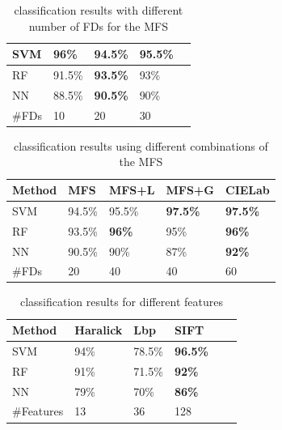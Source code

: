 \documentclass[a4paper,10pt]{article}
\begin{document}
\begin{table}
\begin{center}
\caption{classification results with different number of FDs for the MFS}
\label{tab:number}       %
\begin{tabular}{|l|l|l|l|l|}
\hline
SVM & \textbf{96\%} & 94.5\% & 95.5\% \\
\hline
RF  & 91.5\% & \textbf{93.5\%} & 93\% \\
\hline
NN & 88.5\% & \textbf{90.5\%} & 90\% \\
\hline
\hline
\#FDs & 10  & 20 & 30 \\
\hline
\end{tabular}
\end{center}
\end{table}


\begin{table}
\begin{center}
\caption{classification results using different combinations of the MFS}


\label{tab:mfs}       %
\begin{tabular}{|l|l|l|l|l|}
\hline
Method & MFS & MFS+L & MFS+G & CIELab  \\
\hline
\hline
SVM & 94.5\% & 95.5\% & \textbf{97.5\%} & \textbf{97.5\%} \\
\hline
RF  & 93.5\% & \textbf{96\%} & 95\% & \textbf{96\%} \\
\hline
NN & 90.5\% & 90\% & 87\% & \textbf{92\%} \\
\hline
\hline
\#FDs & 20 & 40 & 40 & 60 \\
\hline
\end{tabular}
\end{center}
\end{table}


\begin{table}
\begin{center}
\caption{classification results for different features}
\label{tab:other}       %
\begin{tabular}{|l|l|l|l|l|l|}
\hline
Method & Haralick & Lbp & SIFT\\ %
\hline
\hline
SVM & 94\% & 78.5\% & \textbf{96.5\%} \\ %
\hline
RF  & 91\% & 71.5\% & \textbf{92\%} \\ %
\hline
NN & 79\% & 70\% & \textbf{86\%} \\ %
\hline
\hline
\#Features & 13 & 36 & 128 \\
\hline
\end{tabular}
\end{center}
\end{table}
\end{document}
